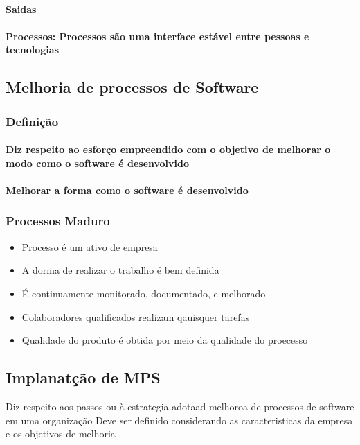 \documentclass{article}
\begin{document}
	\paragraph{Saidas}

	\paragraph{Processos: Processos são uma interface estável entre pessoas e tecnologias}

\subsection{Melhoria de processos de Software}
\subsubsection{Definição}
\paragraph{Diz respeito ao esforço empreendido com o objetivo de melhorar o modo como o software é desenvolvido}	
\paragraph{Melhorar a forma como o software é desenvolvido}

\subsubsection{Processos Maduro}
	\begin{itemize}
	\item Processo é um ativo de empresa
	\item A dorma de realizar o trabalho é bem definida
	\item É continuamente monitorado, documentado, e melhorado
	\item Colaboradores qualificados realizam qauisquer tarefas
	\item Qualidade do produto é obtida por meio da qualidade do proecesso	
	\end{itemize}

\subsection{Implanatção de MPS}
Diz respeito aos passos ou à estrategia adotaad melhoroa de processos de software em uma organização
Deve ser definido considerando as caracteristicas da empresa e os objetivos de melhoria	
\end{document}
